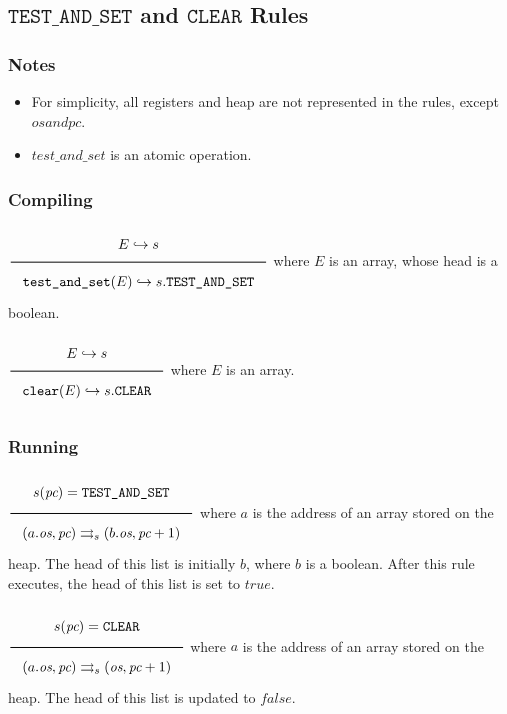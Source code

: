 \documentclass[11pt]{article}
\newcommand{\Rule}[2]{\genfrac{}{}{0.7pt}{}{{\setlength{\fboxrule}{0pt}\setlength{\fboxsep}{3mm}\fbox{$#1$}}}{{\setlength{\fboxrule}{0pt}\setlength{\fboxsep}{3mm}\fbox{$#2$}}}}
\newcommand{\transition}{\rightrightarrows_s}
\newcommand{\translateaux}{\hookrightarrow}
\begin{document}
\subsection{\(\texttt{TEST\_AND\_SET}\) and \(\texttt{CLEAR}\) Rules}
\label{sec:org5eec42e}

\subsubsection{Notes}
\label{sec:orgf230dca}
\begin{itemize}
\item For simplicity, all registers and heap are not represented in the rules, except \(\textit{os} and \textit{pc}\).
\item \(\textit{test\_and\_set}\) is an atomic operation.
\end{itemize}

\subsubsection{Compiling}
\label{sec:org8e554eb}
\(\Rule{E \translateaux s}{\texttt{test\_and\_set}(E) \translateaux s.\texttt{TEST\_AND\_SET}}\\\)
where \(E\) is an array, whose head is a boolean.

\(\Rule{E \translateaux s}{\texttt{clear}(E) \translateaux s.\texttt{CLEAR}}\\\)
where \(E\) is an array.

\subsubsection{Running}
\label{sec:orgdf23403}
\(\Rule{s(\textit{pc}) = \texttt{TEST\_AND\_SET}}{(a.\textit{os},\textit{pc}) \transition (b.\textit{os},\textit{pc} + 1)}\\\)
where \(a\) is the address of an array stored on the heap. The head of this list is initially \(b\), where \(b\) is a boolean. After this rule executes, the head of this list is set to \(\textit{true}\).

\(\Rule{s(\textit{pc}) = \texttt{CLEAR}}{(a.\textit{os},\textit{pc}) \transition (\textit{os},\textit{pc} + 1)}\\\)
where \(a\) is the address of an array stored on the heap. The head of this list is updated to \(\textit{false}\).
\end{document}
